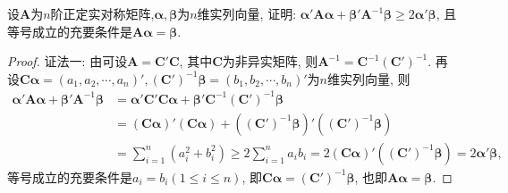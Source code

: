 \documentclass[../../main.tex]{subfiles}
\begin{document}
\begin{example}
设$\boldsymbol{A}$为$n$阶正定实对称矩阵,$\boldsymbol{\alpha}, \boldsymbol{\beta}$为$n$维实列向量, 证明: $\boldsymbol{\alpha}'\boldsymbol{A}\boldsymbol{\alpha}+\boldsymbol{\beta}'\boldsymbol{A}^{-1}\boldsymbol{\beta}\geqslant  2\boldsymbol{\alpha}'\boldsymbol{\beta}$, 且等号成立的充要条件是$\boldsymbol{A}\boldsymbol{\alpha}=\boldsymbol{\beta}$.
\end{example}
\begin{proof}
{\color{blue}证法一:}
由可设$\boldsymbol{A}=\boldsymbol{C}'\boldsymbol{C}$, 其中$\boldsymbol{C}$为非异实矩阵, 则$\boldsymbol{A}^{-1}=\boldsymbol{C}^{-1}(\boldsymbol{C}')^{-1}$. 再设$\boldsymbol{C}\boldsymbol{\alpha}=(a_1, a_2, \cdots, a_n)', (\boldsymbol{C}')^{-1}\boldsymbol{\beta}=(b_1, b_2, \cdots, b_n)'$为$n$维实列向量, 则
\begin{align*}
\boldsymbol{\alpha}'\boldsymbol{A}\boldsymbol{\alpha}+\boldsymbol{\beta}'\boldsymbol{A}^{-1}\boldsymbol{\beta} 
&= \boldsymbol{\alpha}'\boldsymbol{C}'\boldsymbol{C}\boldsymbol{\alpha}+\boldsymbol{\beta}'\boldsymbol{C}^{-1}(\boldsymbol{C}')^{-1}\boldsymbol{\beta}\\
&= (\boldsymbol{C}\boldsymbol{\alpha})'(\boldsymbol{C}\boldsymbol{\alpha})+((\boldsymbol{C}')^{-1}\boldsymbol{\beta})'((\boldsymbol{C}')^{-1}\boldsymbol{\beta})\\
&= \sum_{i = 1}^n (a_i^2 + b_i^2)\geqslant  2\sum_{i = 1}^n a_ib_i = 2(\boldsymbol{C}\boldsymbol{\alpha})'((\boldsymbol{C}')^{-1}\boldsymbol{\beta}) = 2\boldsymbol{\alpha}'\boldsymbol{\beta},
\end{align*}
等号成立的充要条件是$a_i = b_i (1\leqslant  i\leqslant  n)$, 即$\boldsymbol{C}\boldsymbol{\alpha}=(\boldsymbol{C}')^{-1}\boldsymbol{\beta}$, 也即$\boldsymbol{A}\boldsymbol{\alpha}=\boldsymbol{\beta}$. 


\end{proof}
\end{document}
